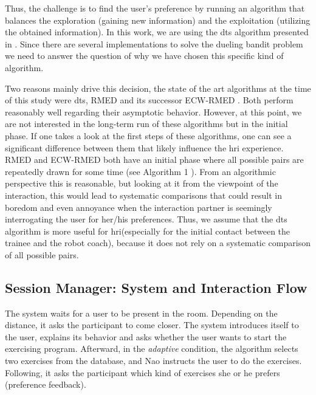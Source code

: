 \documentclass[twocolumn]{svjour3}          %
\begin{document}
Thus, the challenge is to find the user's preference by running an
algorithm that balances the exploration (gaining new information) and
the exploitation (utilizing the obtained information). In this work, we
are using the \gls{dts} algorithm presented in
\autocite{wu2016double}. Since there are several implementations to
solve the dueling bandit problem we need to answer the question of why
we have chosen this specific kind of algorithm.

Two reasons mainly drive this decision, the state of the art algorithms
at the time of this study were \gls{dts}, RMED and its successor ECW-RMED
\autocite{komiyama2015regret,komiyama2016copeland}. Both perform
reasonably well regarding their asymptotic behavior. However, at this
point, we are not interested in the long-term run of these algorithms
but in the initial phase. If one takes a look at the first steps of
these algorithms, one can see a significant difference between them that
likely influence the \gls{hri} experience. RMED and ECW-RMED both have an
initial phase where all possible pairs are repeatedly drawn for some
time (see Algorithm 1 \autocites{komiyama2015regret}{komiyama2016copeland}).
From an algorithmic perspective this is reasonable, but looking at it
from the viewpoint of the interaction, this would lead to systematic
comparisons that could result in boredom and even annoyance when the
interaction partner is seemingly interrogating the user for her/his
preferences. Thus, we assume that the \gls{dts} algorithm is more useful for
\gls{hri}(especially for the initial contact between the trainee and the
robot coach), because it does not rely on a systematic comparison of all
possible pairs.

\hypertarget{session-manager-system-and-interaction-flow}{%
\subsection{Session Manager: System and Interaction
Flow}\label{session-manager-system-and-interaction-flow}}
The system waits for a user to be present in the room. Depending on the
distance, it asks the participant to come closer. The system introduces
itself to the user, explains its behavior and asks whether the user
wants to start the exercising program. Afterward, in the \textit{adaptive}
condition, the algorithm selects two exercises from the database, and
Nao instructs the user to do the exercises. Following, it asks the
participant which kind of exercises she or he prefers (preference
feedback).
\end{document}
